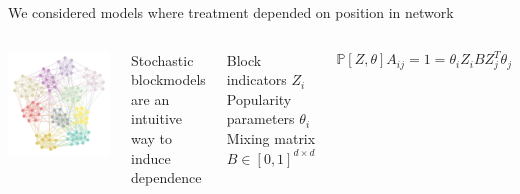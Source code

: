 \documentclass[aspectratio=169]{beamer}
\theoremstyle{remark}
\begin{document}
\begin{frame}{We considered models where treatment depended on position in network}
    
    \begin{columns}
        \centering
        \includegraphics[width=\textwidth]{./figures/assortative.png}
        
        Stochastic blockmodels are an intuitive way to induce dependence \\
        \vspace{4mm}
        
        Block indicators $Z_i$ \\
        Popularity parameters $\theta_i$ \\
        Mixing matrix $B \in [0, 1]^{d \times d}$
        
        \begin{equation*}
            \mathbb P[Z, \theta]{A_{ij} = 1} = \theta_i Z_i B Z_j^T \theta_j
        \end{equation*}
    \end{columns}
\end{frame}
\end{document}
